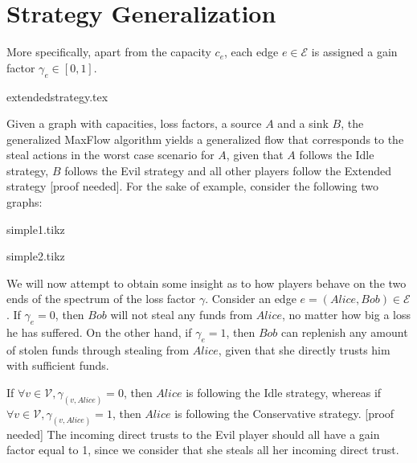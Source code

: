 \section{Strategy Generalization}
  More specifically, apart from the capacity $c_e$, each edge $e \in \mathcal{E}$ is assigned a gain factor $\gamma_e \in
  \left[0, 1\right]$. 
  
  {extendedstrategy.tex}

  Given a graph with capacities, loss factors, a source $A$ and a sink $B$, the generalized MaxFlow algorithm yields a
  generalized flow that corresponds to the steal actions in the worst case scenario for $A$, given that $A$ follows the Idle
  strategy, $B$ follows the Evil strategy and all other players follow the Extended strategy [proof needed]. For the sake of
  example, consider the following two graphs:
  
  {simple1.tikz}

  {simple2.tikz}

  We will now attempt to obtain some insight as to how players behave on the two ends of the spectrum of the loss factor
  $\gamma$. Consider an edge $e = \left(Alice, Bob\right) \in \mathcal{E}$. If $\gamma_e = 0$, then $Bob$ will not steal any
  funds from $Alice$, no matter how big a loss he has suffered. On the other hand, if $\gamma_e = 1$, then $Bob$ can replenish
  any amount of stolen funds through stealing from $Alice$, given that she directly trusts him with sufficient funds.
  
  If $\forall v \in \mathcal{V}, \gamma_{\left(v, Alice\right)} = 0$, then $Alice$ is following the Idle strategy, whereas if
  $\forall v \in \mathcal{V}, \gamma_{\left(v, Alice\right)} = 1$, then $Alice$ is following the Conservative strategy. [proof
  needed] The incoming direct trusts to the Evil player should all have a gain factor equal to 1, since we consider that she
  steals all her incoming direct trust.
